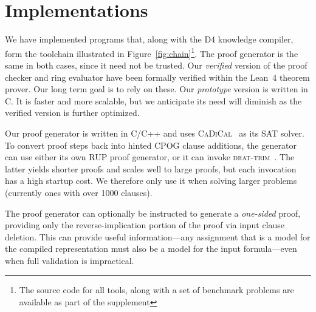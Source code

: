 \documentclass[letterpaper,USenglish,cleveref, autoref, thm-restate]{lipics-v2021}
\newcommand{\progname}[1]{\textsc{#1}}
\newcommand{\dfour}{\progname{D4}}
\newcommand{\cadical}{\progname{CaDiCal}}
\newcommand{\dtrim}{\progname{drat-trim}}
\newcommand{\lean}{Lean~4}
\begin{document}
\section{Implementations}
We have implemented programs that, along with
the \dfour{} knowledge compiler, form the toolchain illustrated in
Figure~\ref{fig:chain}\footnote{The source code for all tools, along with a set of 
benchmark problems are available as part of the supplement\cite{bryant:sat:2023:supplement}}.  The proof generator is the same in both
cases, since it need not be trusted.
Our \emph{verified}
version of the proof checker and ring evaluator have been formally
verified within the \lean{} theorem prover.  Our long term goal is to
rely on these.  Our \emph{prototype} version is written in C\@.
It is faster and
more scalable, but we anticipate its need will diminish as the
verified version is further optimized.

Our proof generator is written in C/C++ and uses
\cadical{}~\cite{biere-cadical-2019} as its SAT solver.  To convert
proof steps back into hinted CPOG clause additions, the generator can
use either its own RUP proof generator, or it can invoke
\dtrim{}~\cite{RAT}.  The latter yields shorter proofs and scales well
to large proofs, but each invocation has a high startup cost.  We
therefore only use it when solving larger problems (currently ones
with over 1000 clauses).

The proof generator can optionally be instructed to generate a {\em
one-sided} proof, providing only the reverse-implication portion of the proof via
input clause deletion.  This can provide useful information---any
assignment that is a model for the compiled representation
must also be a model for the input formula---even when
full validation is impractical.
\end{document}

